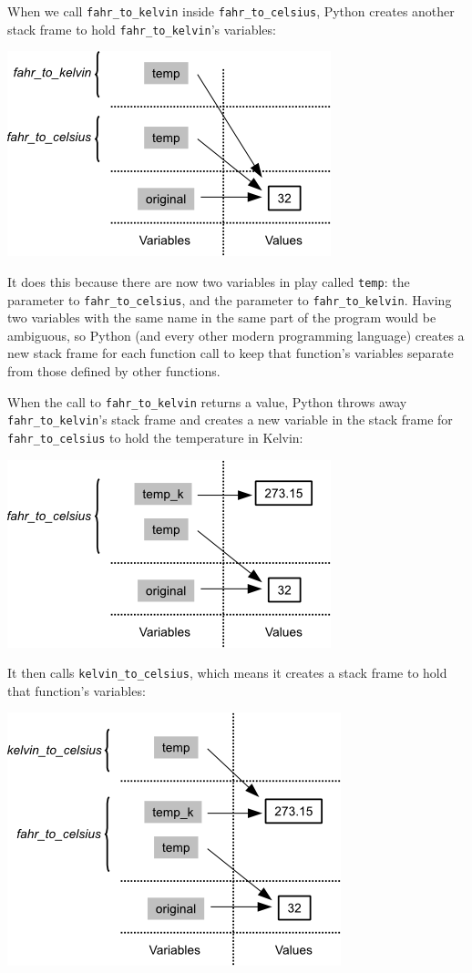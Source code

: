 \documentclass{book}
\begin{document}
When we call \texttt{fahr\_to\_kelvin} inside
\texttt{fahr\_to\_celsius}, Python creates another stack frame to hold
\texttt{fahr\_to\_kelvin}'s variables:

\includegraphics{novice/python/img/python-call-stack-03.png}

It does this because there are now two variables in play called
\texttt{temp}: the parameter to \texttt{fahr\_to\_celsius}, and the
parameter to \texttt{fahr\_to\_kelvin}. Having two variables with the
same name in the same part of the program would be ambiguous, so Python
(and every other modern programming language) creates a new stack frame
for each function call to keep that function's variables separate from
those defined by other functions.

When the call to \texttt{fahr\_to\_kelvin} returns a value, Python
throws away \texttt{fahr\_to\_kelvin}'s stack frame and creates a new
variable in the stack frame for \texttt{fahr\_to\_celsius} to hold the
temperature in Kelvin:

\includegraphics{novice/python/img/python-call-stack-04.png}

It then calls \texttt{kelvin\_to\_celsius}, which means it creates a
stack frame to hold that function's variables:

\includegraphics{novice/python/img/python-call-stack-05.png}
\end{document}
